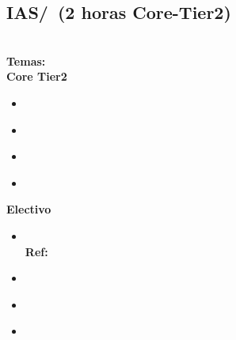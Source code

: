 \subsection{IAS/\IASNetworkSecurity~(2 horas Core-Tier2)}\label{sec:BOK:IASNetworkSecurity}
\IASNetworkSecurityDescription\\
\noindent \textbf{Temas:}\\
\noindent \textbf{Core Tier2}
\begin{itemize}
	\item \IASNetworkSecurityTopicNetwork\label{sec:BOK:IASNetworkSecurityTopicNetwork}
	\item \IASNetworkSecurityTopicUse\label{sec:BOK:IASNetworkSecurityTopicUse}
	\item \IASNetworkSecurityTopicArchitectures\label{sec:BOK:IASNetworkSecurityTopicArchitectures}
	\item \IASNetworkSecurityTopicDefense\label{sec:BOK:IASNetworkSecurityTopicDefense}
\end{itemize}

\noindent \textbf{Electivo}
\begin{itemize}
	\item \IASNetworkSecurityTopicSecurity\xspace \\ \textbf{Ref:} \label{sec:BOK:IASNetworkSecurityTopicSecurity}
	\item \IASNetworkSecurityTopicOther\label{sec:BOK:IASNetworkSecurityTopicOther}
	\item \IASNetworkSecurityTopicCensorship\label{sec:BOK:IASNetworkSecurityTopicCensorship}
	\item \IASNetworkSecurityTopicOperational\label{sec:BOK:IASNetworkSecurityTopicOperational}
\end{itemize}


